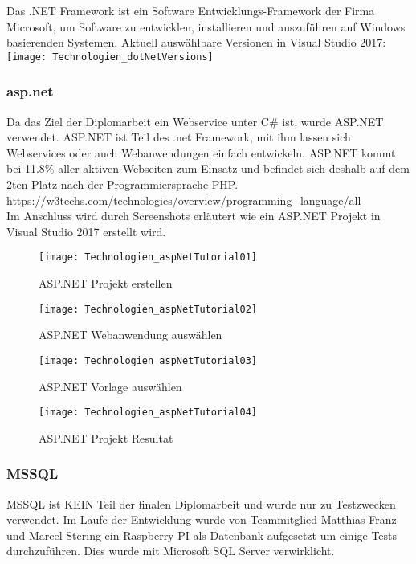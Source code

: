 Das .NET Framework ist ein Software Entwicklungs-Framework der Firma Microsoft, um Software zu entwicklen, installieren und auszuführen auf Windows basierenden Systemen. 
Aktuell auswählbare Versionen in Visual Studio 2017:\\ 

\centering \texttt{[image: Technologien\_dotNetVersions]}

\justifying
\subsubsection {asp.net}
\label{sec:asp.net}
Da das Ziel der Diplomarbeit ein Webservice unter C\# ist, wurde ASP.NET verwendet. ASP.NET ist Teil des .net Framework, mit ihm lassen sich Webservices oder auch Webanwendungen einfach entwickeln. ASP.NET kommt bei 11.8\% aller aktiven Webseiten zum Einsatz und befindet sich deshalb auf dem 2ten Platz nach der Programmiersprache PHP. 
\url {https://w3techs.com/technologies/overview/programming_language/all} 
\\
Im Anschluss wird durch Screenshots erläutert wie ein ASP.NET Projekt in Visual Studio 2017 erstellt wird.

\begin{figure}[H]
    \texttt{[image: Technologien\_aspNetTutorial01]}
    \caption{ASP.NET Projekt erstellen}
    \label{fig:aspNetTut01}
\end{figure}
\begin{figure}[H]
    \texttt{[image: Technologien\_aspNetTutorial02]}
    \caption{ASP.NET Webanwendung auswählen}
    \label{fig:aspNetTut02}
\end{figure}
\begin{figure}[H]
    \texttt{[image: Technologien\_aspNetTutorial03]}
    \caption{ASP.NET Vorlage auswählen}
    \label{fig:aspNetTut03}
\end{figure}
\begin{figure}[H]
    \texttt{[image: Technologien\_aspNetTutorial04]}
    \caption{ASP.NET Projekt Resultat}
    \label{fig:aspNetTut04}
\end{figure}

\subsubsection {MSSQL}
\label{sec:MSSQL}
MSSQL ist KEIN Teil der finalen Diplomarbeit und wurde nur zu Testzwecken verwendet. Im Laufe der Entwicklung wurde von Teammitglied Matthias Franz und Marcel Stering ein Raspberry PI als Datenbank aufgesetzt um einige Tests durchzuführen. Dies wurde mit Microsoft SQL Server verwirklicht. 
